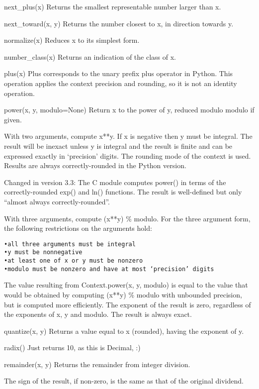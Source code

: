 next\_plus(x)
Returns the smallest representable number larger than x.

next\_toward(x, y)
Returns the number closest to x, in direction towards y.

normalize(x)
Reduces x to its simplest form.

number\_class(x)
Returns an indication of the class of x.

plus(x)
Plus corresponds to the unary prefix plus operator in Python. This operation applies the context precision and rounding, so it is not an identity operation.

power(x, y, modulo=None)
Return x to the power of y, reduced modulo modulo if given.

With two arguments, compute x**y. If x is negative then y must be integral. The result will be inexact unless y is integral and the result is finite and can be expressed exactly in ‘precision’ digits. The rounding mode of the context is used. Results are always correctly-rounded in the Python version.


Changed in version 3.3: The C module computes power() in terms of the correctly-rounded exp() and ln() functions. The result is well-defined but only “almost always correctly-rounded”.

With three arguments, compute (x**y) \% modulo. For the three argument form, the following restrictions on the arguments hold:

\begin{lstlisting}
•all three arguments must be integral
•y must be nonnegative
•at least one of x or y must be nonzero
•modulo must be nonzero and have at most ‘precision’ digits
\end{lstlisting}

The value resulting from Context.power(x, y, modulo) is equal to the value that would be obtained by computing (x**y) \% modulo with unbounded precision, but is computed more efficiently. The exponent of the result is zero, regardless of the exponents of x, y and modulo. The result is always exact.

quantize(x, y)
Returns a value equal to x (rounded), having the exponent of y.

radix()
Just returns 10, as this is Decimal, :)

remainder(x, y)
Returns the remainder from integer division.

The sign of the result, if non-zero, is the same as that of the original dividend.

